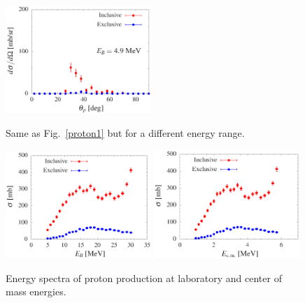 \documentclass[aps,prc,onecolumn,amsmath,amssymb, preprint, 12pt]{revtex4-1}
\begin{document}
\begin{figure}[!ht]
\includegraphics[width=0.49\textwidth]{ad_300.eps}\\
 \caption{\label{proton4}  Same as Fig.~\ref{proton1} but for a different energy range. }
 \end{figure}
 

\begin{figure}[!ht]
\centering
\includegraphics[width=0.49\textwidth]{enerd.eps}
\includegraphics[width=0.49\textwidth]{enerdcm.eps}\\
 \caption{\label{ener}  Energy spectra of proton production at laboratory and center of mass energies. }
 \end{figure}
 
 
\end{document}
